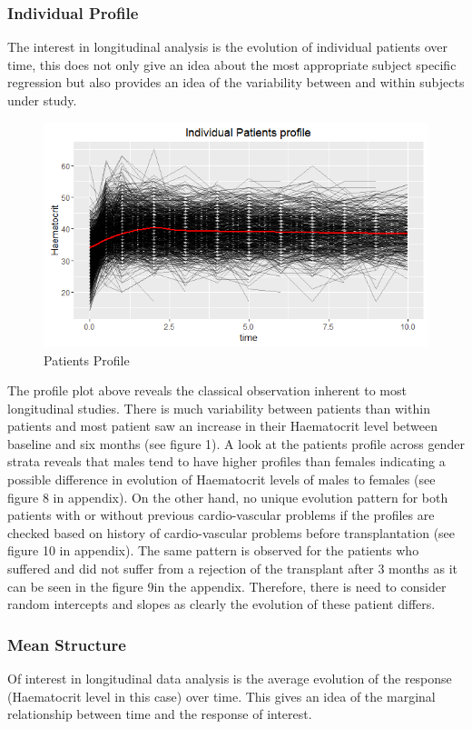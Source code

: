 \documentclass[11pt]{article}
\begin{document}
\subsubsection{Individual Profile}
\noindent The interest in longitudinal analysis is the evolution of individual patients over time, this does not only give an idea about the most appropriate subject specific regression but also provides an idea of the variability between and within subjects under study.

\begin{figure}[H]
\centering
\includegraphics[scale=0.8]{patientsprofile.png}
\caption{Patients Profile}
\end{figure}

The profile plot above reveals the classical observation inherent to most longitudinal studies. There is much variability between patients than within patients and most patient saw an increase in their Haematocrit level between baseline and six months (see figure 1). A look at the patients profile across gender strata reveals that males tend to have higher profiles than females indicating a possible difference in evolution of Haematocrit levels of males to females (see figure 8 in appendix). On the other hand, no unique evolution pattern for both patients with or without previous cardio-vascular problems if the profiles are checked based on history of cardio-vascular problems before transplantation (see figure 10 in appendix). The same pattern is observed for the patients who suffered and did not suffer from a rejection of the transplant after 3 months as it can be seen in the figure 9in the appendix. 
Therefore, there is need to consider random intercepts and slopes as clearly the evolution of these patient differs.

\subsubsection{Mean Structure}
Of interest in longitudinal data analysis is the average evolution of the response (Haematocrit level in this case) over time. This gives an idea of the marginal relationship between time and the response of interest.
\end{document}
